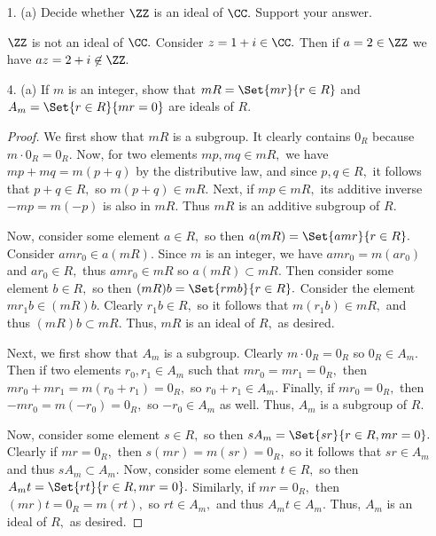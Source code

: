 \documentclass{article}
\begin{document}
\begin{itemize}
	\item[1.] (a) Decide whether $\ZZ$ is an ideal of $\CC.$ Support your answer.
		\begin{soln}
			$\ZZ$ is not an ideal of $\CC.$ Consider $z=1+i\in\CC.$ Then if $a=2\in \ZZ$ we have $az=2+i\not\in\ZZ.$
		\end{soln}

	\item[4.] (a) If $m$ is an integer, show that $mR=\Set{mr}{r\in R}$ and $A_m=\Set{r\in R}{mr=0}$ are ideals of $R.$
		\begin{proof}
			We first show that $mR$ is a subgroup. It clearly contains $0_R$ because $m\cdot 0_R=0_R.$ Now, for two elements $mp, mq\in mR,$ we have $mp+mq=m(p+q)$ by the distributive law, and since $p, q\in R,$ it follows that $p+q\in R,$ so $m(p+q)\in mR.$ Next, if $mp\in mR,$ its additive inverse $-mp=m(-p)$ is also in $mR.$ Thus $mR$ is an additive subgroup of $R.$ 

			Now, consider some element $a\in R,$ so then $a(mR)=\Set{amr}{r\in R}.$ Consider $amr_0\in a(mR).$ Since $m$ is an integer, we have $amr_0= m(ar_0)$ and $ar_0\in R,$ thus $amr_0\in mR$ so $a(mR)\subset mR.$ Then consider some element $b\in R,$ so then $(mR)b=\Set{rmb}{r\in R}.$ Consider the element $mr_1b\in (mR)b.$ Clearly $r_1b\in R,$ so it follows that $m(r_1b)\in mR,$ and thus $(mR)b\subset mR.$ Thus, $mR$ is an ideal of $R,$ as desired.

			Next, we first show that $A_m$ is a subgroup. Clearly $m\cdot 0_R=0_R$ so $0_R\in A_m.$ Then if two elements $r_0, r_1\in A_m$ such that $mr_0=mr_1=0_R,$ then $mr_0+mr_1=m(r_0+r_1)=0_R,$ so $r_0+r_1\in A_m.$ Finally, if $mr_0=0_R,$ then $-mr_0=m(-r_0)=0_R,$ so $-r_0\in A_m$ as well. Thus, $A_m$ is a subgroup of $R.$

			Now, consider some element $s\in R,$ so then $sA_m=\Set{sr}{r\in R, mr=0}.$ Clearly if $mr=0_R,$ then $s(mr)=m(sr)=0_R,$ so it follows that $sr\in A_m$ and thus $sA_m\subset A_m.$ Now, consider some element $t\in R,$ so then $A_m t=\Set{rt}{r\in R, mr=0}.$ Similarly, if $mr=0_R,$ then $(mr)t=0_R=m(rt),$ so $rt\in A_m,$ and thus $A_m t\in A_m.$ Thus, $A_m$ is an ideal of $R,$ as desired.
		\end{proof}


\end{itemize}
\end{document}
